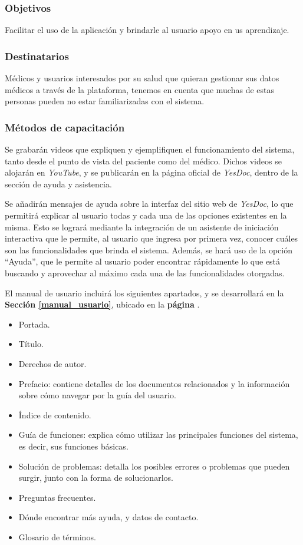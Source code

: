 \documentclass[a4paper,12pt]{article}
\begin{document}
\subsubsection{Objetivos}
Facilitar el uso de la aplicación y brindarle al usuario apoyo en us aprendizaje.
\subsubsection{Destinatarios}
Médicos y usuarios interesados por su salud que quieran gestionar sus datos médicos a través de la plataforma, tenemos en cuenta que muchas de estas personas pueden no estar familiarizadas con el sistema.
\subsubsection{Métodos de capacitación}

Se grabarán videos que expliquen y ejemplifiquen el funcionamiento del sistema, tanto desde el punto de vista del paciente como del médico.
Dichos videos se alojarán en \textit{YouTube}, y se publicarán en la página oficial de \textit{YesDoc}, dentro de la sección de ayuda y asistencia.

Se añadirán mensajes de ayuda sobre la interfaz del sitio web de \textit{YesDoc}, lo que permitirá explicar al usuario todas y cada una de las opciones existentes en la misma.
Esto se logrará mediante la integración de un asistente de iniciación interactiva que le permite, al usuario que ingresa por primera vez, conocer cuáles son las funcionalidades que brinda el sistema.
Además, se hará uso de la opción ``Ayuda'', que le permite al usuario poder encontrar rápidamente lo que está buscando y aprovechar al máximo cada una de las funcionalidades otorgadas.

El manual de usuario incluirá los siguientes apartados, y se desarrollará en la \textbf{Sección \ref{manual_usuario}}, ubicado en la \textbf{página \pageref{manual_usuario}}. %
    \begin{itemize}
        \item   Portada.
        \item   Título.
        \item   Derechos de autor.
        \item   Prefacio: contiene detalles de los documentos relacionados y la información sobre cómo navegar por la guía del usuario.
        \item   Índice de contenido.
        \item   Guía de funciones: explica cómo utilizar las principales funciones del sistema, es decir, sus funciones básicas.
        \item   Solución de problemas: detalla los posibles errores o problemas que pueden surgir, junto con la forma de solucionarlos.
        \item   Preguntas frecuentes.
        \item   Dónde encontrar más ayuda, y datos de contacto.
        \item   Glosario de términos. %

    \end{itemize}
    
\end{document}
